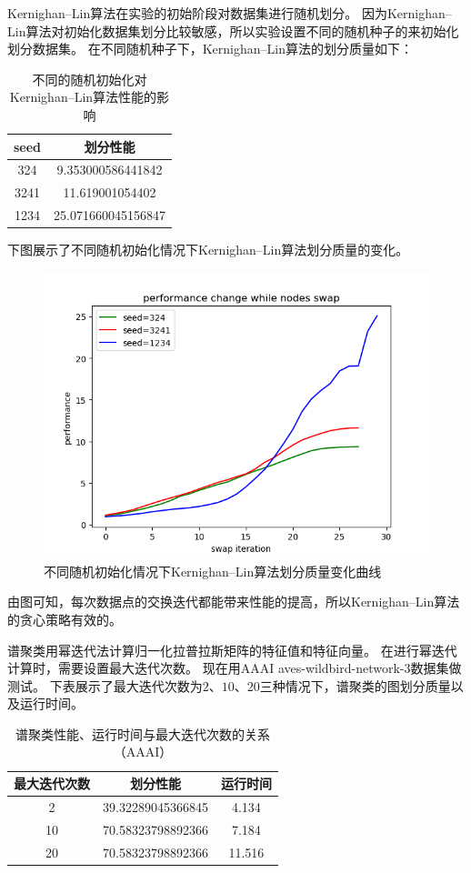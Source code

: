 Kernighan–Lin算法在实验的初始阶段对数据集进行随机划分。
因为Kernighan–Lin算法对初始化数据集划分比较敏感，所以实验设置不同的随机种子的来初始化划分数据集。
在不同随机种子下，Kernighan–Lin算法的划分质量如下：

\begin{table}[htbp]
    \centering
    \begin{tabular}{cc}
        \hline
        seed  &划分性能\\
        \hline
        324   &9.353000586441842\\
        3241  &11.619001054402\\
        1234  &25.071660045156847\\
        \hline
    \end{tabular}
    \caption{不同的随机初始化对Kernighan–Lin算法性能的影响}
\end{table}

下图展示了不同随机初始化情况下Kernighan–Lin算法划分质量的变化。

\begin{figure}[htbp]
    \centering
    \includegraphics[width=0.55\linewidth]{figure/KL.png}
    \caption{不同随机初始化情况下Kernighan–Lin算法划分质量变化曲线}
    \label{}
\end{figure}

由图可知，每次数据点的交换迭代都能带来性能的提高，所以Kernighan–Lin算法的贪心策略有效的。


谱聚类用幂迭代法计算归一化拉普拉斯矩阵的特征值和特征向量。
在进行幂迭代计算时，需要设置最大迭代次数。
现在用AAAI aves-wildbird-network-3数据集做测试。
下表展示了最大迭代次数为$2$、$10$、$20$三种情况下，谱聚类的图划分质量以及运行时间。

\begin{table}[htbp]
    \centering
    \begin{tabular}{ccc}
        \hline
        最大迭代次数 &划分性能&运行时间 \\
        \hline
        2           &39.32289045366845    &4.134 \\
        10          &70.58323798892366    &7.184 \\
        20           &70.58323798892366    &11.516 \\
        \hline
    \end{tabular}
    \caption{谱聚类性能、运行时间与最大迭代次数的关系（AAAI）}
\end{table}

